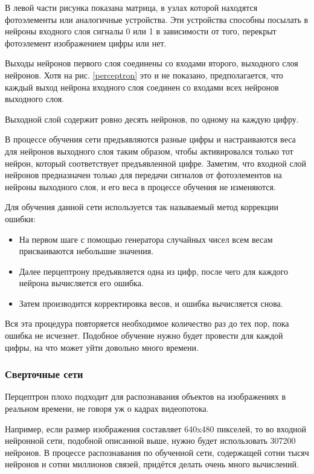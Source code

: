 В левой части рисунка показана матрица, в узлах которой находятся фотоэлементы или аналогичные устройства. Эти устройства способны посылать в нейроны входного слоя сигналы 0 или 1 в зависимости от того, перекрыт фотоэлемент изображением цифры или нет.

Выходы нейронов первого слоя соединены со входами второго, выходного слоя нейронов. Хотя на рис. \ref{perceptron} это и не показано, предполагается, что каждый выход нейрона входного слоя соединен со входами всех нейронов выходного слоя.

Выходной слой содержит ровно десять нейронов, по одному на каждую цифру.

В процессе обучения сети предъявляются разные цифры и настраиваются веса для нейронов выходного слоя таким образом, чтобы активировался только тот нейрон, который соответствует предъявленной цифре. Заметим, что входной слой нейронов предназначен только для передачи сигналов от фотоэлементов на нейроны выходного слоя, и его веса в процессе обучения не изменяются.

Для обучения данной сети используется так называемый метод коррекции ошибки:
\begin{itemize}
    \item На первом шаге с помощью генератора случайных чисел всем весам присваиваются небольшие значения.
    \item Далее перцептрону предъявляется одна из цифр, после чего для каждого нейрона вычисляется его ошибка.
    \item Затем производится корректировка весов, и ошибка вычисляется снова.
\end{itemize}

Вся эта процедура повторяется необходимое количество раз до тех пор, пока ошибка не исчезнет. Подобное обучение нужно будет провести для каждой цифры, на что может уйти довольно много времени.

\subsubsection*{Сверточные сети}

Перцептрон плохо подходит для распознавания объектов на изображениях в реальном времени, не говоря уж о кадрах видеопотока.

Например, если размер изображения составляет 640x480 пикселей, то во входной нейронной сети, подобной описанной выше, нужно будет использовать 307200 нейронов. В процессе распознавания по обученной сети, содержащей сотни тысяч нейронов и сотни миллионов связей, придётся делать очень много вычислений.

